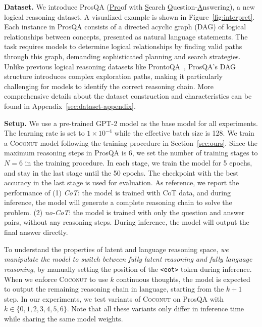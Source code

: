 \documentclass[]{fairmeta}
\newcommand{\ours}{\textsc{Coconut}\xspace}
\begin{document}
\noindent\textbf{Dataset.} We introduce ProsQA (\underline{Pro}of with \underline{S}earch \underline{Q}uestion-\underline{A}nswering), a new logical reasoning dataset. A visualized example is shown in Figure~\ref{fig:interpret}. Each instance in ProsQA consists of a directed acyclic graph (DAG) of logical relationships between concepts, presented as natural language statements. The task requires models to determine logical relationships by finding valid paths through this graph, demanding sophisticated planning and search strategies. Unlike previous logical reasoning datasets like ProntoQA~\citep{saparov2022language}, ProsQA's DAG structure introduces complex exploration paths, making it particularly challenging for models to identify the correct reasoning chain. More comprehensive details about the dataset construction and characteristics can be found in Appendix~\ref{sec:dataset-appendix}.


\noindent\textbf{Setup.} We use a pre-trained GPT-2 model as the base model for all experiments. The learning rate is set to $1\times 10^{-4}$ while the effective batch size is 128. We train a \ours model following the training procedure in Section~\ref{sec:ours}. Since the maximum reasoning steps in ProsQA is 6, we set the number of training stages to $N=6$ in the training procedure. In each stage, we train the model for 5 epochs, and stay in the last stage until the 50 epochs. The checkpoint with the best accuracy in the last stage is used for evaluation. As reference, we report the performance of (1) \textit{CoT}: the model is trained with CoT data, and during inference, the model will generate a complete reasoning chain to solve the problem. (2) \textit{no-CoT}: the model is trained with only the question and answer pairs, without any reasoning steps. During inference, the model will output the final answer directly. 


To understand the properties of latent and language reasoning space, \textit{we manipulate the model to switch between fully latent reasoning and fully language reasoning}, by manually setting the position of the \texttt{<eot>} token during inference. When we enforce \ours to use $k$ continuous thoughts, the model is expected to output the remaining reasoning chain in language, starting from the $k+1$ step. In our experiments, we test variants of \ours on ProsQA with $k \in \{0, 1, 2, 3, 4, 5, 6\}$. Note that all these variants only differ in inference time while sharing the same model weights.
\end{document}
